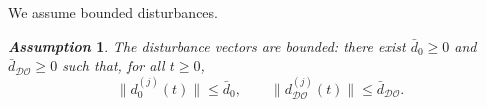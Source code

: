 \documentclass{ifacconf}
\def\col#1{\mathop{{\rm col}\,\left(\,#1\,\right)}}
\def\V{\mathcal{V}} %
\def\G{\mathcal{G}} %
\def\W{\mathcal{W}} %
\def\L{\mathcal{L}} %
\def\LO{\mathcal{LO}} %
\def\DO{\mathcal{DO}} %
\def\diag#1{\mathop{{\rm diag}\,\left(\,#1\,\right)}}
\newtheorem{assumption}{\it \textbf{Assumption}}%
\begin{document}

%
We assume bounded disturbances.
\begin{assumption}\label{assum_distur}
The disturbance vectors are bounded: there exist $\bar{d}_{0} \geq 0$ and $\bar{d}_{\DO} \geq 0$ such that, for all $t\geq 0$,
\[
\|d_0^{(j)}(t)\| \le \bar{d}_{0},
\qquad
\|d_{\DO}^{(j)}(t)\| \le \bar{d}_{\DO}.
\]
\end{assumption}
\end{document}
